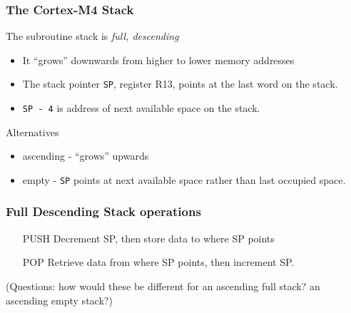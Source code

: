 \documentclass[10pt]{beamer}
\begin{document}
\begin{frame}
\frametitle{The Cortex-M4 Stack}
\begin{center}
\end{center}
The subroutine stack is \emph{full, descending}
\begin{itemize}
\item It ``grows'' downwards from higher to lower memory addresses
\item The stack pointer \texttt{SP}, register R13, points at the last word on the stack.
\item \texttt{SP - 4} is address of next available space on the stack. 
\end{itemize} 
Alternatives
\begin{itemize}
\item ascending - ``grows'' upwards
\item empty - \texttt{SP} points at next available space rather than last occupied space. 
\end{itemize} 
\end{frame}

\begin{frame}
\frametitle{Full Descending Stack operations}
\begin{itemize}
\item[PUSH] Decrement SP, then store data to where SP points
\item[POP] Retrieve data from where SP points, then increment SP.
\end{itemize} 
(Questions: how would these be different for an ascending full stack? an ascending empty stack?)
\end{frame}
\end{document}
